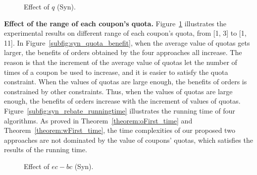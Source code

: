 \begin{figure}[t!]\centering
	\subfigcapskip=-5pt
	\vspace{-2ex}
	\addtocounter{subfigure}{-1}
	\figureCaptionMargin
	\caption{\small Effect of $q$ (Syn).}\figureBelowMargin
	\label{fig:syn_q}
\end{figure}

\textbf{Effect of the range of each coupon's quota.} Figure~\ref{fig:syn_q} illustrates the experimental results on different range of each coupon's quota, from [1, 3] to [1, 11]. In Figure~\ref{subfig:syn_quota_benefit}, when the average value of quotas gets larger, the benefits of orders obtained by the four approaches all increase. The reason is that the increment of the average value of quotas let the number of times of a coupon be used to increase, and it is easier to satisfy the quota constraint. When the values of quotas are large enough, the benefits of orders is constrained by other constraints. Thus, when the values of quotas are large enough, the benefits of orders increase with the increment of values of quotas. Figure~\ref{subfig:syn_rebate_runningtime} illustrates the running time of four algorithms. As proved in Theorem~\ref{theorem:oFirst_time} and Theorem~\ref{theorem:wFirst_time}, the time complexities of our proposed two approaches are not dominated by the value of coupons' quotas, which satisfies the results of the running time.

\begin{figure}[t!]\centering
	\subfigcapskip=-5pt
	\vspace{-2ex}
	\addtocounter{subfigure}{-1}
	\figureCaptionMargin
	\caption{\small Effect of $ec-bc$ (Syn).}\figureBelowMargin
	\label{fig:syn_c_wait}
\end{figure}


